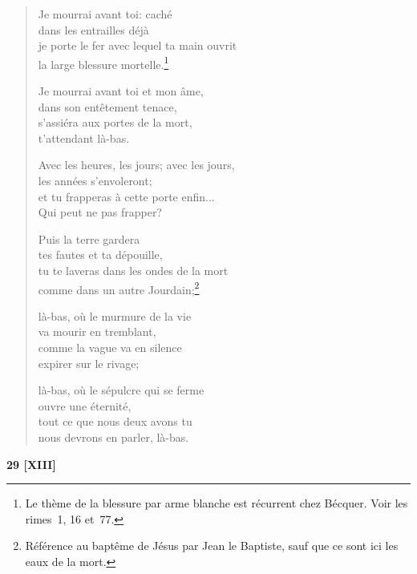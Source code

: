\begin{verse}
  Je mourrai avant toi: caché \\
  dans les entrailles déjà \\
  je porte le fer avec lequel ta main ouvrit \\
  la large blessure mortelle.\footnote{Le thème de la blessure
  par arme blanche est récurrent chez Bécquer. Voir les rimes~1, 16 et~77.}

  Je mourrai avant toi et mon âme, \\
  dans son entêtement tenace, \\
  s'assiéra aux portes de la mort, \\
  t'attendant là-bas.

  Avec les heures, les jours; avec les jours, \\
  les années s'envoleront; \\
  et tu frapperas à cette porte enfin... \\
  Qui peut ne pas frapper?

  Puis la terre gardera \\
  tes fautes et ta dépouille, \\
  tu te laveras dans les ondes de la mort \\
  comme dans un autre Jourdain;\footnote{Référence au baptême de Jésus
  par Jean le Baptiste, sauf que ce sont ici les eaux de la mort.}

  là-bas, où le murmure de la vie \\
  va mourir en tremblant, \\
  comme la vague va en silence \\
  expirer sur le rivage;

  là-bas, où le sépulcre qui se ferme \\
  ouvre une éternité, \\
  tout ce que nous deux avons tu \\
  nous devrons en parler, là-bas.
\end{verse}

\bigskip

\begin{center}
  \textbf{29 [XIII]}
\end{center}

